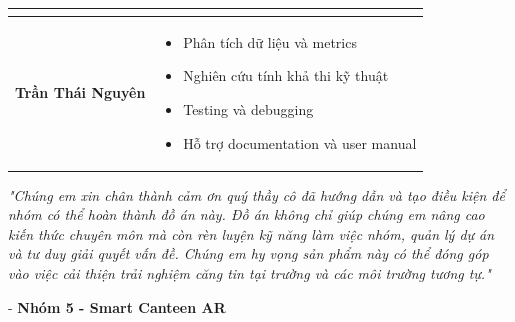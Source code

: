 \documentclass[12pt,a4paper]{article}
\begin{document}
\begin{table}[H]
\begin{tabular}{@{}>{\raggedright\arraybackslash}p{3.5cm}>{\raggedright\arraybackslash}p{11cm}@{}}
\begin{itemize}[leftmargin=0.3cm,topsep=0pt,itemsep=1pt]
\end{itemize} \\
\midrule
\textbf{Trần Thái Nguyên} & 
\begin{itemize}[leftmargin=0.3cm,topsep=0pt,itemsep=1pt]
    \item Phân tích dữ liệu và metrics
    \item Nghiên cứu tính khả thi kỹ thuật
    \item Testing và debugging
    \item Hỗ trợ documentation và user manual
\end{itemize} \\
\bottomrule
\end{tabular}
\end{table}

\begin{tcolorbox}[colback=orange!5!white,colframe=orange,title=\textbf{Lời cảm ơn}]
\textit{"Chúng em xin chân thành cảm ơn quý thầy cô đã hướng dẫn và tạo điều kiện để nhóm có thể hoàn thành đồ án này. Đồ án không chỉ giúp chúng em nâng cao kiến thức chuyên môn mà còn rèn luyện kỹ năng làm việc nhóm, quản lý dự án và tư duy giải quyết vấn đề. Chúng em hy vọng sản phẩm này có thể đóng góp vào việc cải thiện trải nghiệm căng tin tại trường và các môi trường tương tự."}

\hfill - \textbf{Nhóm 5 - Smart Canteen AR}
\end{tcolorbox}
\end{document}
